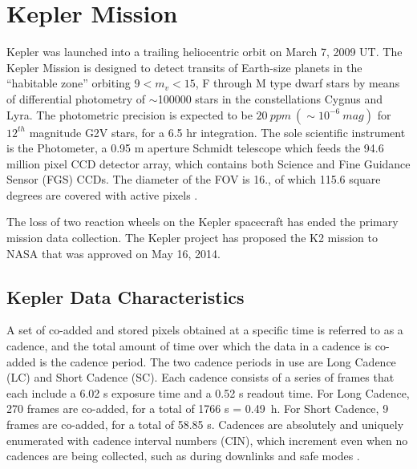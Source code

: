 \chapter{Kepler Mission} %
\label{Chapter2} %


Kepler was launched into a trailing heliocentric orbit on March 7, 2009 UT. The Kepler Mission is
designed to detect transits of Earth-size planets in the “habitable zone” orbiting $9<m_{v}<15$, F through M
type dwarf stars by means of differential photometry of $\sim$100000 stars in the constellations Cygnus and
Lyra. The photometric precision is expected to be $20 ~ppm ~(\sim10^{-6} ~mag)$ for $12^{th}$ magnitude G2V stars, 
for a 6.5 hr integration. The sole scientific instrument is the Photometer, a 0.95 m aperture Schmidt telescope which
feeds the 94.6 million pixel CCD detector array, which contains both Science and Fine Guidance Sensor
(FGS) CCDs. The diameter of the FOV is 16., of which 115.6 square degrees are covered with active
pixels
\citep{kepler2009}.

The loss of two reaction wheels on the Kepler spacecraft has ended the primary mission data collection.
The Kepler project has proposed the K2 mission to NASA \citep{howel2014} that was approved on May 16, 2014.

\section{Kepler Data Characteristics}
A set of co-added and stored pixels obtained at a specific time is referred to as a cadence,
and the total amount of time over which the data in a cadence is co-added is the cadence
period. The two cadence periods in use are Long Cadence (LC) and Short Cadence (SC).
Each cadence consists of a series of frames that each include a 6.02 s exposure time and a
0.52 s readout time. For Long Cadence, 270 frames are co-added, for a total of 1766 s = 0.49~h. 
For Short Cadence, 9 frames are co-added, for a total of 58.85 s. Cadences are
absolutely and uniquely enumerated with cadence interval numbers (CIN), which
increment even when no cadences are being collected, such as during downlinks and safe
modes \citep{kepler2013}.

